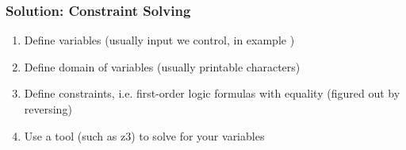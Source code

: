 \documentclass[aspectratio=169]{beamer}
\begin{document}
{%

\begin{frame}[fragile]
    \frametitle{Solution: Constraint Solving}
    \begin{enumerate}
        \item Define variables (usually input we control, in example )
        \item Define domain of variables (usually printable characters)
        \item Define constraints, i.e. first-order logic formulas with equality (figured out by reversing)
        \item Use a tool (such as z3) to solve for your variables
    \end{enumerate}
\end{frame}

}
\end{document}
